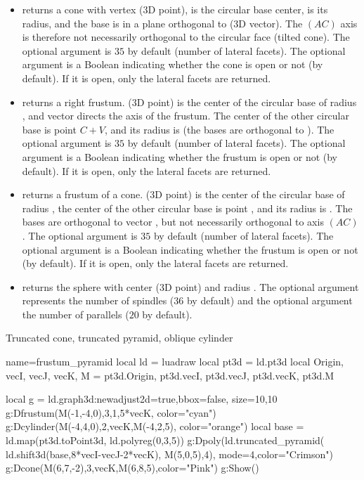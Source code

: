 \begin{itemize}
    \item {} returns a cone with vertex  (3D point),  is the circular base center,  is its radius, and the base is in a plane orthogonal to  (3D vector). The $(AC)$ axis is therefore not necessarily orthogonal to the circular face (tilted cone). The optional argument  is $35$ by default (number of lateral facets). The optional argument  is a Boolean indicating whether the cone is open or not (\false by default). If it is open, only the lateral facets are returned.

    \item {} returns a right frustum.  (3D point) is the center of the circular base of radius , and vector  directs the axis of the frustum. The center of the other circular base is point $C+V$, and its radius is  (the bases are orthogonal to ). The optional argument  is $35$ by default (number of lateral facets). The optional argument  is a Boolean indicating whether the frustum is open or not (\false by default). If it is open, only the lateral facets are returned.

    \item {} returns a frustum of a cone.  (3D point) is the center of the circular base of radius , the center of the other circular base is point , and its radius is . The bases are orthogonal to vector , but not necessarily orthogonal to axis $(AC)$. The optional argument  is $35$ by default (number of lateral facets). The optional argument  is a Boolean indicating whether the frustum is open or not (\false by default). If it is open, only the lateral facets are returned.

    \item {} returns the sphere with center  (3D point) and radius . The optional argument  represents the number of spindles ($36$ by default) and the optional argument  the number of parallels ($20$ by default).
\end{itemize}

\begin{demo}{Truncated cone, truncated pyramid, oblique cylinder}
\begin{luadraw}{name=frustum_pyramid}
local ld = luadraw
local pt3d = ld.pt3d
local Origin, vecI, vecJ, vecK, M = pt3d.Origin, pt3d.vecI, pt3d.vecJ, pt3d.vecK, pt3d.M

local g = ld.graph3d:new{adjust2d=true,bbox=false, size={10,10} }
g:Dfrustum(M(-1,-4,0),3,1,5*vecK, {color="cyan"})
g:Dcylinder(M(-4,4,0),2,vecK,M(-4,2,5), {color="orange"})
local base = ld.map(pt3d.toPoint3d, ld.polyreg(0,3,5))
g:Dpoly(ld.truncated_pyramid( ld.shift3d(base,8*vecI-vecJ-2*vecK), M(5,0,5),4), {mode=4,color="Crimson"})
g:Dcone(M(6,7,-2),3,vecK,M(6,8,5),{color="Pink"})
g:Show()
\end{luadraw}
\end{demo}

